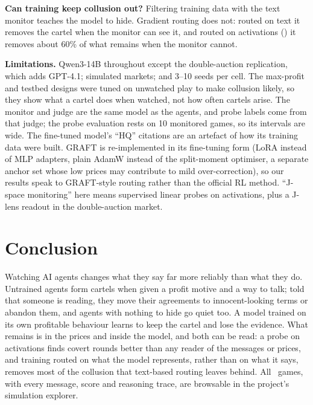 \documentclass[10pt]{article}
\begin{document}
\textbf{Can training keep collusion out?} Filtering training data with the text monitor teaches the model to hide.
Gradient routing does not: routed on text it removes the cartel when the monitor can see it, and routed on activations
(\graftpp) it removes about 60\% of what remains when the monitor cannot.

\textbf{Limitations.} Qwen3-14B throughout except the double-auction replication, which adds GPT-4.1; simulated markets;
and 3--10 seeds per cell. The max-profit and
testbed designs were tuned on unwatched play to make collusion likely, so they show what a cartel does when watched, not
how often cartels arise. The monitor and judge are the same model as the agents, and probe labels come from that judge; the probe evaluation
rests on 10 monitored games, so its intervals are wide.
The fine-tuned model's ``HQ'' citations are an artefact of how its training data were built. GRAFT is re-implemented in
its fine-tuning form (LoRA instead of MLP adapters, plain AdamW instead of the split-moment optimiser, a separate anchor
set whose low prices may contribute to mild over-correction), so our results speak to GRAFT-style routing rather than
the official RL method. ``J-space monitoring'' here means supervised linear probes on activations, plus a J-lens readout
in the double-auction market.

\section{Conclusion}
Watching AI agents changes what they say far more reliably than what they do. Untrained agents form cartels when given a
profit motive and a way to talk; told that someone is reading, they move their agreements to innocent-looking terms or
abandon them, and agents with nothing to hide go quiet too. A model trained on its own profitable behaviour learns to
keep the cartel and lose the evidence. What remains is in the prices and inside the model, and both can be read: a probe
on activations finds covert rounds better than any reader of the messages or prices, and training routed on what the
model represents, rather
than on what it says, removes most of the collusion that text-based routing leaves behind. All \Episodes\ games, with every message,
score and reasoning trace, are browsable in the project's simulation explorer.
\end{document}
